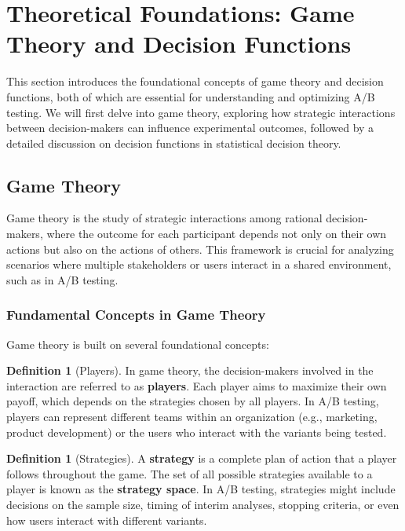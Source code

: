 \documentclass[magisterska, english]{pwr_wmat_praca_dyplomowa}
\theoremstyle{plain}
\numberwithin{theorem}{chapter}
\theoremstyle{definition}
\numberwithin{theorem}{chapter}
\newtheorem{definition}[theorem]{Definition}
\begin{document}
\section{Theoretical Foundations: Game Theory and Decision Functions}

This section introduces the foundational concepts of game theory and decision functions, both of which are essential for understanding and optimizing A/B testing. We will first delve into game theory, exploring how strategic interactions between decision-makers can influence experimental outcomes, followed by a detailed discussion on decision functions in statistical decision theory.


\subsection{Game Theory}

Game theory is the study of strategic interactions among rational decision-makers, where the outcome for each participant depends not only on their own actions but also on the actions of others. This framework is crucial for analyzing scenarios where multiple stakeholders or users interact in a shared environment, such as in A/B testing.

\subsubsection{Fundamental Concepts in Game Theory}

Game theory is built on several foundational concepts:

\begin{definition}[Players]
	In game theory, the decision-makers involved in the interaction are referred to as \textbf{players}. Each player aims to maximize their own payoff, which depends on the strategies chosen by all players. In A/B testing, players can represent different teams within an organization (e.g., marketing, product development) or the users who interact with the variants being tested.
\end{definition}

\begin{definition}[Strategies]
	A \textbf{strategy} is a complete plan of action that a player follows throughout the game. The set of all possible strategies available to a player is known as the \textbf{strategy space}. In A/B testing, strategies might include decisions on the sample size, timing of interim analyses, stopping criteria, or even how users interact with different variants.
\end{definition}
\end{document}
